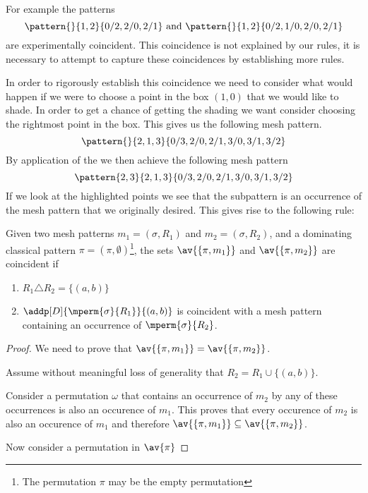 For example the patterns
\begin{equation*}
    \pattern{}{1,2}{0/2,2/0,2/1} \text{ and } \pattern{}{1,2}{0/2,1/0,2/0,2/1}
\end{equation*}
are experimentally coincident. This coincidence is not explained by our rules,
it is necessary to attempt to capture these coincidences by establishing more
rules.

In order to rigorously establish this coincidence we need to consider what would
happen if we were to choose a point in the box \((1,0)\) that we would like to shade.
In order to get a chance of getting the shading we want consider choosing the
rightmost point in the box.
This gives us the following mesh pattern.
\begin{equation*}
    \pattern{}{2,1,3}{0/3,2/0,2/1,3/0,3/1,3/2}
\end{equation*}
By application of the  we then achieve the following
mesh pattern
\begin{equation*}
    \pattern{2,3}{2,1,3}{0/3,2/0,2/1,3/0,3/1,3/2}
\end{equation*}
If we look at the highlighted points we see that the subpattern is an occurrence
of the mesh pattern that we originally desired. This gives rise to the following
rule:

\begin{proposition}
    \label{prop:dom3}
    Given two mesh patterns \(m_1 =(\sigma, R_1)\) and \(m_2 = (\sigma, R_2)\),
    and a dominating classical pattern \(\pi = (\pi,\emptyset)\)\footnote{The
    permutation \(\pi\) may be the empty permutation}, the sets
    \(\av{\{\pi,m_1\}}\) and \(\av{\{\pi,m_2\}}\) are coincident if
    \begin{enumerate}
        \item \(R_1 \triangle R_2 = \{(a,b)\}\)
        \item \(\addp[D]{\mperm{\sigma}{R_1}}{(a,b)}\) is coincident with a
            mesh pattern containing an occurrence of \(\mperm{\sigma}{R_2}\).
    \end{enumerate}
\end{proposition}
\begin{proof}
    We need to prove that \(\av{\{\pi,m_1\}} = \av{\{\pi,m_2\}}\).

    Assume without meaningful loss of generality that \(R_2 = R_1 \cup \{(a,b)\}\).

    Consider a permutation \(\omega\) that contains an occurrence of \(m_2\)
    by  any of these occurrences is also an occurence
    of \(m_1\). This proves that every occurence of \(m_2\) is also an
    occurence of \(m_1\) and therefore \(\av{\{\pi,m_1\}} \subseteq \av{\{\pi,m_2\}}\).

    Now consider a permutation in \(\av{\pi}\)
\end{proof}


